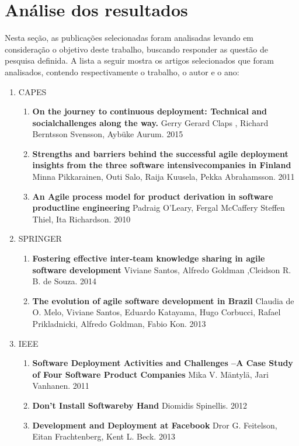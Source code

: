 \documentclass[12pt]{article}
\begin{document}
\section{Análise dos resultados} \label{sec5}

Nesta  seção,  as  publicações  selecionadas  foram  analisadas  levando  em  consideração  o
objetivo deste trabalho, buscando responder as questão de pesquisa definida. A lista a seguir mostra os artigos selecionados que foram analisados, contendo respectivamente o trabalho, o autor e o ano:

\begin{enumerate}
  \item CAPES
    \begin{enumerate}
      \item \textbf{On the journey to continuous deployment: Technical and socialchallenges along the way.}  Gerry Gerard Claps , Richard Berntsson Svensson, Aybüke Aurum. 2015
      \item \textbf{Strengths and barriers behind the successful agile deployment insights from the three software intensivecompanies in Finland} Minna Pikkarainen, Outi Salo, Raija Kuusela, Pekka Abrahamsson. 2011
        \item \textbf{An Agile process model for product derivation in software productline engineering} Padraig O’Leary, Fergal McCaffery Steffen Thiel, Ita Richardson. 2010
    \end{enumerate}
  \item SPRINGER
    \begin{enumerate}
      \item \textbf{Fostering effective inter-team knowledge sharing in agile software development} Viviane Santos, Alfredo Goldman ,Cleidson R. B. de Souza.  2014
      \item \textbf{The evolution of agile software development in Brazil} Claudia de O. Melo, Viviane Santos, Eduardo Katayama, Hugo Corbucci, Rafael Prikladnicki, Alfredo Goldman, Fabio Kon.  2013
    \end{enumerate}
  \item IEEE
    \begin{enumerate}
      \item \textbf{Software Deployment Activities and Challenges –A Case Study of Four Software Product Companies} Mika V. Mäntylä, Jari Vanhanen. 2011
      \item \textbf{Don’t Install Softwareby Hand} Diomidis Spinellis. 2012
      \item \textbf{Development and Deployment at Facebook } Dror G. Feitelson, Eitan Frachtenberg, Kent L. Beck.  2013

\end{enumerate}
\end{enumerate}
\end{document}
